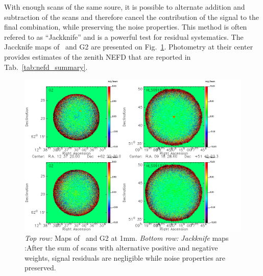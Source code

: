 With enough scans of the same soure, it is possible to alternate addition and
subtraction of the scans and therefore cancel the contribution of the signal to
the final combination, while preserving the noise properties. This method is
often refered to as ``Jackknife'' and is a powerful test for residual
systematics. The Jaccknife maps of \hls\ and G2 are presented on
Fig.~\ref{fig:jk_maps}. Photometry at their center provides estimates of the
zenith NEFD that are reported in Tab.~\ref{tab:nefd_summary}.

\begin{figure}[hhh]
\begin{center}
\includegraphics[clip, angle=0, scale=0.5]{Figures/nefd_jackknife.png}
\caption[Jackknife maps of G2 and \hls]{\emph{Top row:} Maps of \hls\ and G2 at
  1mm. \emph{Bottom row:} \emph{Jackknife} maps :After the sum of scans with alternative positive and negative
  weights, signal residuals are negligible while noise properties are preserved.}
\label{fig:jk_maps}
\end{center}
\end{figure}

